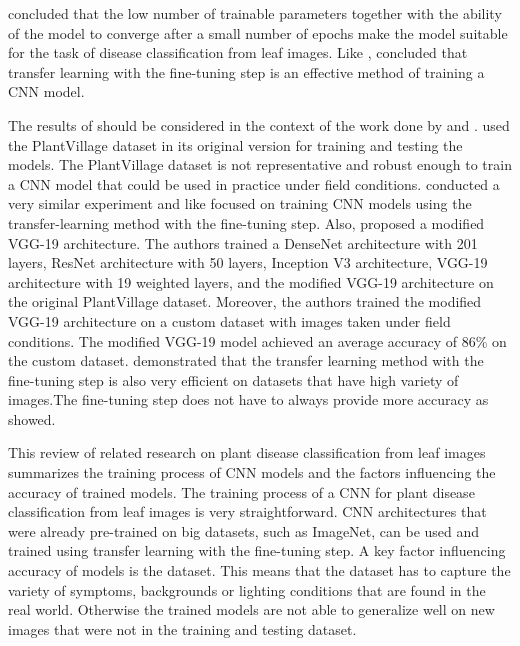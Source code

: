 \documentclass{BachelorBUI}
\begin{document}
        \cite{Too:2019} concluded that the low number of trainable parameters together with the ability of the model to converge after a small number of epochs make the model suitable for the task of disease classification from leaf images. Like \textcite{Mohanty:2016}, \textcite{Too:2019} concluded that transfer learning with the fine-tuning step is an effective method of training a CNN model.

        The results of \textcite{Too:2019} should be considered in the context of the work done by \textcite{Barbedo:2018:1} and \textcite{Barbedo:2018:2}. \textcite{Too:2019} used the PlantVillage dataset in its original version for training and testing the models. The PlantVillage dataset is not representative and robust enough to train a CNN model that could be used in practice under field conditions. \textcite{Chen:2020} conducted a very similar experiment and like \textcite{Too:2019} focused on training CNN models using the transfer-learning method with the fine-tuning step. Also, \textcite{Chen:2020} proposed a modified VGG-19 architecture. The authors trained a DenseNet architecture with 201 layers, ResNet architecture with 50 layers, Inception V3 architecture, VGG-19 architecture with 19 weighted layers, and the modified VGG-19 architecture on the original PlantVillage dataset. Moreover, the authors trained the modified VGG-19 architecture on a custom dataset with images taken under field conditions. The modified VGG-19 model achieved an average accuracy of 86\% on the custom dataset.  \textcite{Chen:2020} demonstrated that the transfer learning method with the fine-tuning step is also very efficient on datasets that have high variety of images.The fine-tuning step does not have to always provide more accuracy as \textcite{Sladojevic:2016} showed.

        This review of related research on plant disease classification from leaf images summarizes the training process of CNN models and the factors influencing the accuracy of trained models. The training process of a CNN for plant disease classification from leaf images is very straightforward. CNN architectures that were already pre-trained on big datasets, such as ImageNet, can be used and trained using transfer learning with the fine-tuning step. A key factor influencing accuracy of models is the dataset. This means that the dataset has to capture the variety of symptoms, backgrounds or lighting conditions that are found in the real world. Otherwise the trained models are not able to generalize well on new images that were not in the training and testing dataset.
\end{document}
